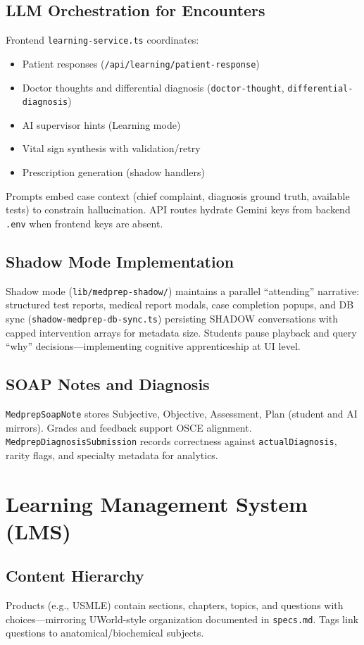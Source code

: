 \subsection{LLM Orchestration for Encounters}
Frontend \texttt{learning-service.ts} coordinates:
\begin{itemize}
  \item Patient responses (\texttt{/api/learning/patient-response})
  \item Doctor thoughts and differential diagnosis (\texttt{doctor-thought}, \texttt{differential-diagnosis})
  \item AI supervisor hints (Learning mode)
  \item Vital sign synthesis with validation/retry
  \item Prescription generation (shadow handlers)
\end{itemize}
Prompts embed case context (chief complaint, diagnosis ground truth, available tests) to constrain hallucination. API routes hydrate Gemini keys from backend \texttt{.env} when frontend keys are absent.

\subsection{Shadow Mode Implementation}
Shadow mode (\texttt{lib/medprep-shadow/}) maintains a parallel ``attending'' narrative: structured test reports, medical report modals, case completion popups, and DB sync (\texttt{shadow-medprep-db-sync.ts}) persisting SHADOW conversations with capped intervention arrays for metadata size. Students pause playback and query ``why'' decisions---implementing cognitive apprenticeship at UI level.

\subsection{SOAP Notes and Diagnosis}
\texttt{MedprepSoapNote} stores Subjective, Objective, Assessment, Plan (student and AI mirrors). Grades and feedback support OSCE alignment. \texttt{MedprepDiagnosisSubmission} records correctness against \texttt{actualDiagnosis}, rarity flags, and specialty metadata for analytics.

\section{Learning Management System (LMS)}
\subsection{Content Hierarchy}
Products (e.g., USMLE) contain sections, chapters, topics, and questions with choices---mirroring UWorld-style organization documented in \texttt{specs.md}. Tags link questions to anatomical/biochemical subjects.

